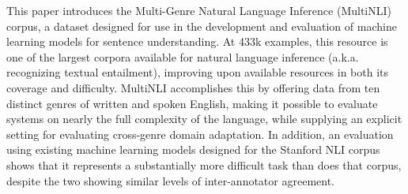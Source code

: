 This paper introduces the Multi-Genre Natural Language Inference (MultiNLI) corpus, a dataset designed for use in the development and evaluation of machine learning models for sentence understanding. At 433k examples,  this resource is one of the largest corpora available for natural language inference (a.k.a. recognizing textual entailment), improving upon available resources in both its coverage and difficulty. MultiNLI accomplishes this by offering data from ten distinct genres of written and spoken English, making it possible to evaluate systems on nearly the full complexity of the language, while supplying an explicit setting for evaluating cross-genre domain adaptation. In addition, an evaluation using existing machine learning models designed for the Stanford NLI corpus shows that it represents a substantially more difficult task than does that corpus, despite the two showing similar levels of inter-annotator agreement.
